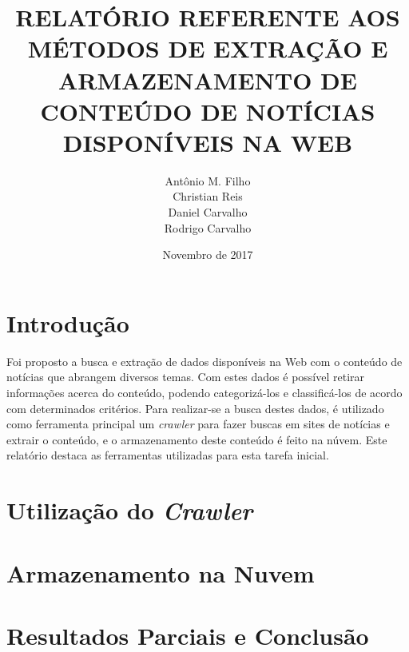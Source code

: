 \documentclass[10pt,a4paper,oneside,titlepage]{article}
\author{Antônio M. Filho \\ Christian Reis \\ Daniel Carvalho \\ Rodrigo Carvalho}
\title{RELATÓRIO REFERENTE AOS MÉTODOS DE EXTRAÇÃO E ARMAZENAMENTO DE CONTEÚDO DE NOTÍCIAS DISPONÍVEIS NA WEB}
\date{Novembro de 2017}
\begin{document}
\maketitle

\section{Introdução}

Foi proposto a busca e extração de dados disponíveis na Web com o conteúdo de notícias que abrangem diversos temas. Com estes dados é possível retirar informações acerca do conteúdo, podendo categorizá-los e classificá-los de acordo com determinados critérios. Para realizar-se a busca destes dados, é utilizado como ferramenta principal um \textit{crawler} para fazer buscas em sites de notícias e extrair o conteúdo, e o armazenamento deste conteúdo é feito na núvem. Este relatório destaca as ferramentas utilizadas para esta tarefa inicial.

\section{Utilização do \textit{Crawler}}



\section{Armazenamento na Nuvem}



\section{Resultados Parciais e Conclusão}
\end{document}
